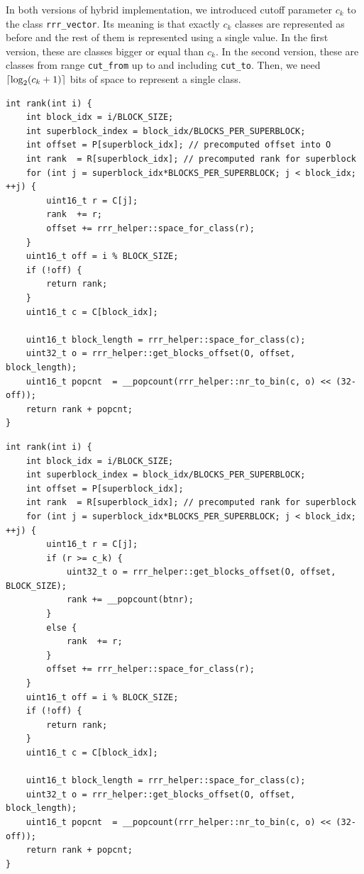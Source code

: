 In both versions of hybrid implementation, we introduced cutoff parameter $c_k$ to the
class \texttt{rrr\_vector}. Its meaning is that exactly $c_k$ classes are represented
as before and the rest of them is represented using a single value. In the first version,
these are classes bigger or equal than $c_k$. In the second version, these are classes
from range \texttt{cut\_from} up to and including \texttt{cut\_to}. Then, we need
$\left\lceil \log_2(c_k+1) \right\rceil$ bits of space to represent a single class.

\begin{lstlisting}
int rank(int i) {
	int block_idx = i/BLOCK_SIZE;
	int superblock_index = block_idx/BLOCKS_PER_SUPERBLOCK;
	int offset = P[superblock_idx]; // precomputed offset into O
	int rank  = R[superblock_idx]; // precomputed rank for superblock
	for (int j = superblock_idx*BLOCKS_PER_SUPERBLOCK; j < block_idx; ++j) {
		uint16_t r = C[j];
		rank  += r;
		offset += rrr_helper::space_for_class(r);
	}
	uint16_t off = i % BLOCK_SIZE;
	if (!off) {
		return rank;
	}
	uint16_t c = C[block_idx];

	uint16_t block_length = rrr_helper::space_for_class(c);
	uint32_t o = rrr_helper::get_blocks_offset(O, offset, block_length);
	uint16_t popcnt  = __popcount(rrr_helper::nr_to_bin(c, o) << (32-off));
	return rank + popcnt;
}
\end{lstlisting}

\begin{lstlisting}
int rank(int i) {
	int block_idx = i/BLOCK_SIZE;
	int superblock_index = block_idx/BLOCKS_PER_SUPERBLOCK;
	int offset = P[superblock_idx];
	int rank  = R[superblock_idx]; // precomputed rank for superblock
	for (int j = superblock_idx*BLOCKS_PER_SUPERBLOCK; j < block_idx; ++j) {
		uint16_t r = C[j];
		if (r >= c_k) {
			uint32_t o = rrr_helper::get_blocks_offset(O, offset, BLOCK_SIZE);
			rank += __popcount(btnr);
		}
		else {
			rank  += r;
		}
		offset += rrr_helper::space_for_class(r);
	}
	uint16_t off = i % BLOCK_SIZE;
	if (!off) {
		return rank;
	}
	uint16_t c = C[block_idx];

	uint16_t block_length = rrr_helper::space_for_class(c);
	uint32_t o = rrr_helper::get_blocks_offset(O, offset, block_length);
	uint16_t popcnt  = __popcount(rrr_helper::nr_to_bin(c, o) << (32-off));
	return rank + popcnt;
}
\end{lstlisting}

